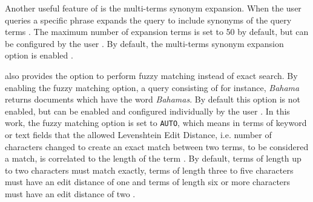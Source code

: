Another useful feature of \databaseName{} is the multi-terms synonym expansion.
When the user queries a specific phrase \databaseName{} expands the query to include synonyms of the query terms \cite{Elasticsearch-synonyms}.
The maximum number of expansion terms is set to 50 by default, but can be configured by the user \cite{Elasticsearch-match}.
By default, the multi-terms synonym expansion option is enabled \cite{Elasticsearch-match}.

\databaseName{} also provides the option to perform fuzzy matching instead of exact search.
By enabling the fuzzy matching option, a \databaseName{} query consisting of for instance, \textit{Bahama} returns documents which have the word \textit{Bahamas}.
By default this option is not enabled, but can be enabled and configured individually by the user \cite{Elasticsearch-match}.
In this work, the fuzzy matching option is set to \texttt{AUTO}, which means in terms of keyword or text fields that the allowed Levenshtein Edit Distance, 
i.e. number of characters changed to create an exact match between two terms, to be considered a match, is correlated to the length of the term \cite{Elasticsearch-fuzziness}.
By default, terms of length up to two characters must match exactly, terms of length three to five characters must have an edit distance of one and 
terms of length six or more characters must have an edit distance of two \cite{Elasticsearch-fuzziness}.

